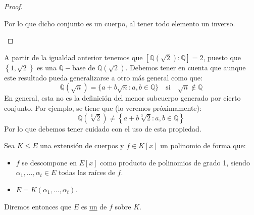 \begin{ejemplo}
\begin{proof}
\begin{description}
                Por lo que dicho conjunto es un cuerpo, al tener todo elemento un inverso.
        \end{description}
    \end{proof}
    \noindent
    A partir de la igualdad anterior tenemos que $\left[\mathbb{Q}\left(\sqrt{2}\right): \mathbb{Q}\right] = 2$, puesto que $\left\{1,\sqrt{2}\right\}$ es una $\mathbb{Q}-$base de $\mathbb{Q}\left(\sqrt{2}\right)$. Debemos tener en cuenta que aunque este resultado pueda generalizarse a otro más general como que:
    \begin{equation*}
        \mathbb{Q}(\sqrt{n}) = \{a+b\sqrt{n}:a,b\in \mathbb{Q}\} \quad \text{si}\quad  \sqrt{n}\notin \mathbb{Q}
    \end{equation*}
    En general, esta no es la definición del menor subcuerpo generado por cierto conjunto. Por ejemplo, se tiene que (lo veremos próximamente):
    \begin{equation*}
        \mathbb{Q}\left(\sqrt[3]{2}\right) \neq \left\{a+b\sqrt[3]{2}:a,b\in \mathbb{Q}\right\}
    \end{equation*}
    Por lo que debemos tener cuidado con el uso de esta propiedad.
\end{ejemplo}

\begin{definicion}
    Sea $K\leq E$ una extensión de cuerpos y $f\in K[x]$ un polinomio de forma que:
    \begin{itemize}
        \item $f$ se descompone en $E[x]$ como producto de polinomios de grado 1, siendo $\alpha_1,\ldots,\alpha_t\in E$ todas las raíces de $f$.
        \item $E = K(\alpha_1,\ldots,\alpha_t)$.
    \end{itemize}
    Diremos entonces que $E$ es \underline{un}  de $f$ sobre $K$.
\end{definicion}

